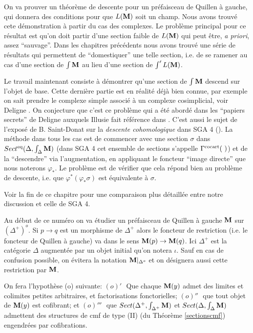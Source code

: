 \documentclass[12pt]{article}
\newcommand{\mm}{{\bf M}}
\begin{document}
\label{quidescentepage}

On va prouver un th\'eor\`eme de descente pour un pr\'efaisceau de Quillen
\`a gauche, qui donnera des conditions pour que $L(\mm )$ soit un champ.
Nous avons trouv\'e cete d\'emonstration \`a partir du cas des complexes.
Le probl\`eme principal pour ce r\'esultat est qu'on doit partir d'une
section faible de $L(\mm )$ qui peut \^etre, {\em a priori}, assez ``sauvage''.
Dans les chapitres pr\'ec\'edents nous
avons trouv\'e une s\'erie de r\'esultats qui permettent de ``domestiquer'' une
telle section, i.e. de
se ramener au cas d'une section de $\int \mm$ au lieu d'une
section de $\int 'L(\mm )$.

Le travail maintenant consiste \`a d\'emontrer qu'une
section de $\int \mm$ descend sur l'objet de base. Cette derni\`ere partie
est en
r\'ealit\'e d\'ej\`a bien connue, par exemple on sait prendre le complexe simple
associ\'e \`a un complexe cosimplicial, voir Deligne \cite{HodgeIII}.
On conjecture que c'est ce probl\`eme qui a \'et\'e abord\'e
dans les ``papiers secrets'' de Deligne auxquels Illusie
fait r\'ef\'erence dans
\cite{Illusie}.
C'est aussi le sujet de l'expos\'e de B. Saint-Donat sur la {\em descente
cohomologique} dans SGA 4 (\cite{SGA4}). La m\'ethode dans tous les
cas est de commencer
avec une section $\sigma$ dans $Sect ^{\rm eq} (\Delta , \int _{\Delta} \mm
)$ (dans SGA 4 cet
ensemble de sections s'appelle $\Gamma ^{\rm cocart}(\, \, )$) et de la
``descendre'' via
l'augmentation, en appliquant le foncteur ``image directe'' que nous noterons
$\varphi _{\ast}$.
Le probl\`eme est de v\'erifier que cela r\'epond bien au probl\`eme de
descente, i.e. que
$\varphi ^{\ast} (\varphi _{\ast} \sigma )$ est \'equivalente \`a $\sigma$.

Voir la fin de ce chapitre pour une comparaison
plus d\'etaill\'ee entre notre discussion et celle de SGA 4.

Au d\'ebut de ce num\'ero on va \'etudier un pr\'efaisceau de Quillen \`a gauche
$\mm$ sur $(\Delta ^+)^o$. Si $p\rightarrow q$ est un morphisme de $\Delta^+$
alors le foncteur de restriction (i.e. le foncteur de Quillen \`a gauche) va
dans le sens $\mm (p)\rightarrow \mm (q)$. Ici  $\Delta ^+$ est la cat\'egorie
$\Delta$ augment\'ee par un objet initial qu'on notera $\iota$. Sauf en cas de
confusion possible, on \'evitera la notation $\mm |_{\Delta ^o}$ et
on d\'esignera aussi
cette restriction par $\mm$.

On fera l'hypoth\`ese (o) suivante:
\newline
$(o)'$\,\, Que  chaque $\mm (y)$  admet des limites et colimites
petites arbitraires, et factorisations fonctorielles;
\newline
$(o)''$\,\,
que tout objet de $\mm (y)$ est cofibrant; et
\newline
$(o)'''$\,\, que $Sect (\Delta ^+, \int
_{\Delta ^+}\mm )$ et $Sect (\Delta , \int _{\Delta} \mm )$ admettent des
structures de cmf de type (II)
(du Th\'eor\`eme \ref{sectionscmf}) engendr\'ees par
cofibrations.
\end{document}
